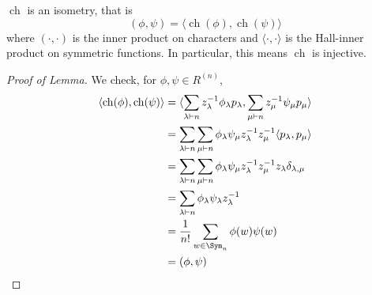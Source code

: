 \documentclass[11pt,leqno,oneside]{amsart}
\numberwithin{thm}{section}
\newcommand{\partitionof}{\vdash}
\newcommand{\ch}{\operatorname{ch}}
\begin{document}
\begin{lem}
  \(\ch\) is an isometry, that is \[
    (\phi,\psi) = \langle \ch(\phi),\ch(\psi) \rangle
  \]
  where \((\cdot,\cdot)\) is the inner product on characters and
  \(\langle \cdot,\cdot \rangle\) is the Hall-inner product on
  symmetric functions. In particular, this means \(\ch\) is injective.
\end{lem}
\begin{proof}[Proof of Lemma]
  We check, for \(\phi, \psi \in R^{(n)}\),
  \begin{align*}
    \langle \ch(\phi), \ch(\psi) \rangle
    & = \langle
    \sum_{\lambda \partitionof n} z_\lambda^{-1} \phi_\lambda
    p_\lambda, \sum_{\mu \partitionof n} z_\mu^{-1} \psi_\mu p_\mu
      \rangle \\
    & = \sum_{\lambda \partitionof n} \sum_{\mu \partitionof n}
    \phi_\lambda \psi_\mu z_{\lambda}^{-1} z_\mu^{-1} \langle
      p_\lambda, p_\mu \rangle \\
    & = \sum_{\lambda \partitionof n} \sum_{\mu \partitionof n}
    \phi_\lambda \psi_\mu z_{\lambda}^{-1} z_\mu^{-1} z_\lambda
      \delta_{\lambda,\mu} \\
    & = \sum_{\lambda \partitionof n} \phi_\lambda
      \psi_\lambda z_{\lambda}^{-1} \\
    & = \frac{1}{n!}\sum_{w \in \Sym_n} \phi(w)\psi(w) \\
    & = (\phi,\psi)
  \end{align*}
\end{proof}
\end{document}

